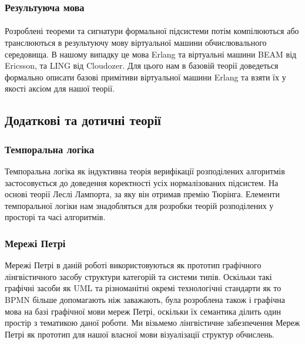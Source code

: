 \documentclass[11pt,oneside]{article}
\begin{document}
\subsubsection{Результуюча мова}

   \paragraph{}
   Розроблені теореми та сигнатури
   формальної підсистеми потім компілюються або транслюються в результуючу мову віртуальної машини
   обчислювального середовища. В нашому випадку це мова Erlang та віртуальні
   машини BEAM від Ericsson, та LING від Cloudozer. Для цього нам в базовій теорії доведеться
   формально описати базові примітиви віртуальної машини Erlang та взяти їх
   у якості аксіом для нашої теорії.

\subsection{Додаткові та дотичні теорії}
\vspace{0.5cm}

   \subsubsection{Темпоральна логіка}
   Темпоральна логіка як індуктивна теорія верифікації розподілених алгоритмів
   застосовується до доведення коректності усіх нормалізованих підсистем. На основі
   теорії  Леслі Лампорта\cite{tla}, за яку він отримав премію Тюрінга.
   Елементи темпоральної логіки нам знадобляться для розробки теорій
   розподілених у просторі та часі алгоритмів.\\

   \subsubsection{Мережі Петрі}
   Мережі Петрі в даній роботі використовуються як прототип графічного
   лінгвістичного засобу структури категорій та системи типів. Оскільки
   такі графічні засоби як UML та різноманітні окремі технологічні
   стандарти як то BPMN більше допомагають ніж заважають, була розроблена
   також і графічна мова на базі графічної мови мереж Петрі, оскільки їх
   семантика ділить один простір з тематикою даної роботи. Ми візьмемо
   лінгвістичне забезпечення Мереж Петрі як прототип для нашої власної
   мови візуалізації структур обчислень.
\end{document}
